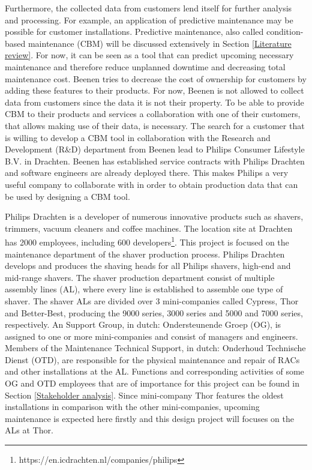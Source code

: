 Furthermore, the collected data from customers lend itself for further analysis and processing. For example, an application of predictive maintenance may be possible for customer installations. Predictive maintenance, also called condition-based maintenance (CBM) will be discussed extensively in Section \ref{Literature review}. For now, it can be seen as a tool that can predict upcoming necessary maintenance and therefore reduce unplanned downtime and decreasing total maintenance cost. Beenen tries to decrease the cost of ownership for customers by adding these features to their products. For now, Beenen is not allowed to collect data from customers since the data it is not their property. To be able to provide CBM to their products and services a collaboration with one of their customers, that allows making use of their data, is necessary. The search for a customer that is willing to develop a CBM tool in collaboration with the Research and Development (R\&D) department from Beenen lead to Philips Consumer Lifestyle B.V. in Drachten. Beenen has  established service contracts with Philips Drachten and software engineers are already deployed there. This makes Philips a very useful company to collaborate with in order to obtain production data that can be used by designing a CBM tool. 

Philips Drachten is a developer of numerous innovative products such as shavers, trimmers, vacuum cleaners and coffee machines. The location site at Drachten has 2000 employees, including 600 developers\footnote{https://en.icdrachten.nl/companies/philips}. This project is focused on the maintenance department of the shaver production process. Philips Drachten develops and produces the shaving heads for all Philips shavers, high-end and mid-range shavers. The shaver production department consist of multiple assembly lines (AL), where every line is established to assemble one type of shaver. The shaver ALs are divided over 3 mini-companies called Cypress, Thor and Better-Best, producing the 9000 series, 3000 series and 5000 and 7000 series, respectively. An Support Group, in dutch: Ondersteunende Groep (OG), is assigned to one or more mini-companies and consist of managers and engineers. Members of the Maintenance Technical Support, in dutch: Onderhoud Technische Dienst (OTD), are responsible for the physical maintenance and repair of RACs and other installations at the AL. Functions and corresponding activities of some OG and OTD employees that are of importance for this project can be found in Section \ref{Stakeholder analysis}. Since mini-company Thor features the oldest installations in comparison with the other mini-companies, upcoming maintenance is expected here firstly and this design project will focuses on the ALs at Thor.

